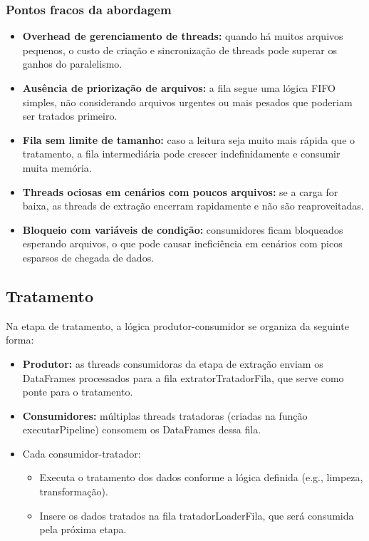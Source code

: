 \documentclass[a4paper,12pt]{article}
\begin{document}
\subsubsection*{Pontos fracos da abordagem}

\begin{itemize}
    \item \textbf{Overhead de gerenciamento de threads:} quando há muitos arquivos pequenos, o custo de criação e sincronização de threads pode superar os ganhos do paralelismo.

    \item \textbf{Ausência de priorização de arquivos:} a fila segue uma lógica FIFO simples, não considerando arquivos urgentes ou mais pesados que poderiam ser tratados primeiro.

    \item \textbf{Fila sem limite de tamanho:} caso a leitura seja muito mais rápida que o tratamento, a fila intermediária pode crescer indefinidamente e consumir muita memória.

    \item \textbf{Threads ociosas em cenários com poucos arquivos:} se a carga for baixa, as threads de extração encerram rapidamente e não são reaproveitadas.

    \item \textbf{Bloqueio com variáveis de condição:} consumidores ficam bloqueados esperando arquivos, o que pode causar ineficiência em cenários com picos esparsos de chegada de dados.

\end{itemize}

\subsection*{Tratamento}
Na etapa de tratamento, a lógica produtor-consumidor se organiza da seguinte forma:

\begin{itemize}
    \item \textbf{Produtor:} as threads consumidoras da etapa de extração enviam os DataFrames processados para a fila extratorTratadorFila, que serve como ponte para o tratamento.

    \item \textbf{Consumidores:} múltiplas threads tratadoras (criadas na função executarPipeline) consomem os DataFrames dessa fila.

    \item Cada consumidor-tratador:
    \begin{itemize}
        \item Executa o tratamento dos dados conforme a lógica definida (e.g., limpeza, transformação).

        \item Insere os dados tratados na fila tratadorLoaderFila, que será consumida pela próxima etapa.
        
    \end{itemize}

\end{itemize}
\end{document}
